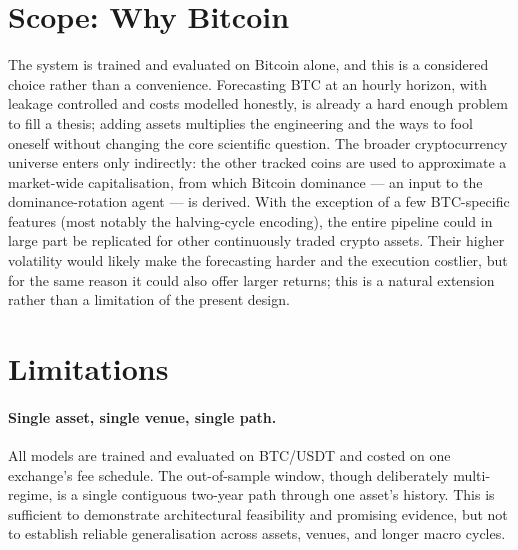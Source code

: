 \section{Scope: Why Bitcoin}
\label{sec:scope_btc}

The system is trained and evaluated on Bitcoin alone, and this is a considered choice rather than a convenience. Forecasting BTC at an hourly horizon, with leakage controlled and costs modelled honestly, is already a hard enough problem to fill a thesis; adding assets multiplies the engineering and the ways to fool oneself without changing the core scientific question. The broader cryptocurrency universe enters only indirectly: the other tracked coins are used to approximate a market-wide capitalisation, from which Bitcoin dominance --- an input to the dominance-rotation agent --- is derived. With the exception of a few BTC-specific features (most notably the halving-cycle encoding), the entire pipeline could in large part be replicated for other continuously traded crypto assets. Their higher volatility would likely make the forecasting harder and the execution costlier, but for the same reason it could also offer larger returns; this is a natural extension rather than a limitation of the present design.

\section{Limitations}
\label{sec:limitations}

\paragraph{Single asset, single venue, single path.}
All models are trained and evaluated on BTC/USDT and costed on one exchange's fee schedule. The out-of-sample window, though deliberately multi-regime, is a single contiguous two-year path through one asset's history. This is sufficient to demonstrate architectural feasibility and promising evidence, but not to establish reliable generalisation across assets, venues, and longer macro cycles.

